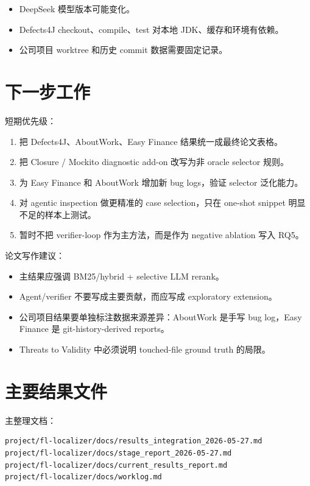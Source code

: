 \documentclass[12pt,a4paper]{ctexart}
\begin{document}
\begin{itemize}
  \item DeepSeek 模型版本可能变化。
  \item Defects4J checkout、compile、test 对本地 JDK、缓存和环境有依赖。
  \item 公司项目 worktree 和历史 commit 数据需要固定记录。
\end{itemize}

\section{下一步工作}

短期优先级：

\begin{enumerate}
  \item 把 Defects4J、AboutWork、Easy Finance 结果统一成最终论文表格。
  \item 把 Closure / Mockito diagnostic add-on 改写为非 oracle selector 规则。
  \item 为 Easy Finance 和 AboutWork 增加新 bug logs，验证 selector 泛化能力。
  \item 对 agentic inspection 做更精准的 case selection，只在 one-shot snippet 明显不足的样本上测试。
  \item 暂时不把 verifier-loop 作为主方法，而是作为 negative ablation 写入 RQ5。
\end{enumerate}

论文写作建议：

\begin{itemize}
  \item 主结果应强调 BM25/hybrid + selective LLM rerank。
  \item Agent/verifier 不要写成主要贡献，而应写成 exploratory extension。
  \item 公司项目结果要单独标注数据来源差异：AboutWork 是手写 bug log，Easy Finance 是 git-history-derived reports。
  \item Threats to Validity 中必须说明 touched-file ground truth 的局限。
\end{itemize}

\section{主要结果文件}

主整理文档：

\begin{lstlisting}
project/fl-localizer/docs/results_integration_2026-05-27.md
project/fl-localizer/docs/stage_report_2026-05-27.md
project/fl-localizer/docs/current_results_report.md
project/fl-localizer/docs/worklog.md
\end{lstlisting}
\end{document}
